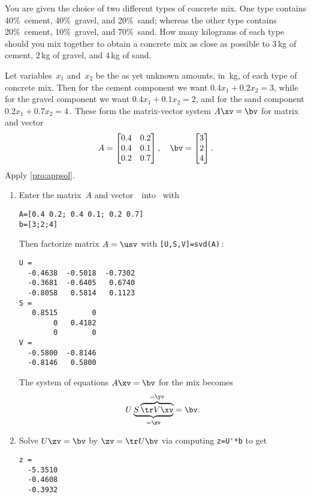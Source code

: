 \begin{reduce}
\begin{example} \label{eg:twotcm} %
You are given the choice of two different types of concrete mix.
One type contains 40\%~cement, 40\%~gravel, and 20\%~sand; whereas the other type contains 20\%~cement, 10\%~gravel, and 70\%~sand.
How many kilograms of each type should you mix together to obtain a concrete mix as close as possible to \(3\)\,kg of cement, \(2\)\,kg of gravel, and \(4\)\,kg of sand.
\begin{solution} 
Let variables~\(x_1\) and~\(x_2\) be the as yet unknown amounts, in~kg, of each type of concrete mix. 
Then for the cement component we want \(0.4x_1+0.2x_2=3\), while for the gravel component we want \(0.4x_1+0.1x_2=2\), and for the sand component \(0.2x_1+0.7x_2=4\)\,.
These form the matrix-vector system \(A\xv=\bv\) for matrix and vector
\begin{equation*}
A=\begin{bmatrix} 0.4&0.2\\0.4&0.1\\0.2&0.7 \end{bmatrix},
\quad \bv=\begin{bmatrix} 3\\2\\4 \end{bmatrix}.
\end{equation*}
Apply \cref{pro:appsol}.
\begin{enumerate}
\item Enter the matrix~\(A\) and vector~\bv\ into \script\ with
\setbox\ajrqrbox\hbox{}%
\marginajrbox%
\begin{verbatim}
A=[0.4 0.2; 0.4 0.1; 0.2 0.7]
b=[3;2;4]
\end{verbatim}
Then factorize matrix \(A=\usv\) with \verb|[U,S,V]=svd(A)|\,:
\begin{verbatim}
U =
  -0.4638  -0.5018  -0.7302
  -0.3681  -0.6405   0.6740
  -0.8058   0.5814   0.1123
S =
   0.8515        0
        0   0.4182
        0        0
V =
  -0.5800  -0.8146
  -0.8146   0.5800
\end{verbatim}
The system of equations \(A\xv=\bv\) for the mix becomes
\begin{equation*}
U\underbrace{S\overbrace{\tr V\xv}^{=\yv}}_{=\zv}
=\bv.
\end{equation*}
\item Solve \(U\zv=\bv\) by  \(\zv=\tr U\bv\) via computing \verb|z=U'*b| to get
\begin{verbatim}
z =
  -5.3510
  -0.4608
  -0.3932
\end{verbatim}


\end{enumerate}
\end{solution}
\end{example}
\end{reduce}
